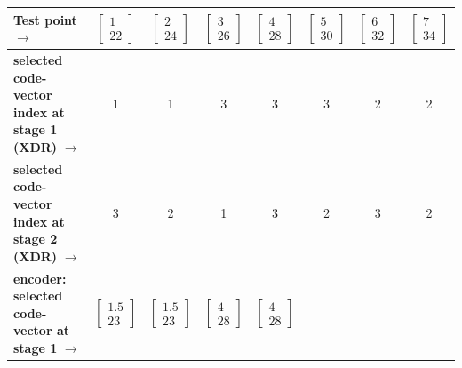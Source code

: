 \begin{table}[t]
\tiny
\centering
\begin{tabular}{|l||c|c|c|c|c|c|c|}\hline 
\textbf{Test point} $\rightarrow$                             			& 
$\left[\begin{array}{c}1 \\22\end{array}\right]$  				&
$\left[\begin{array}{c}2 \\24\end{array}\right]$ 					&
$\left[\begin{array}{c}3 \\26\end{array}\right]$   				&
$\left[\begin{array}{c}4 \\28\end{array}\right]$   				&
$\left[\begin{array}{c}5 \\30\end{array}\right]$ 					&
$\left[\begin{array}{c}6 \\32\end{array}\right]$ 					&
$\left[\begin{array}{c}7 \\34\end{array}\right]$ \\\hline\hline
\textbf{selected code-vector index at stage 1 (XDR)} $\rightarrow$ & 1     &  1   &  3   &  3   &  3   &  2     & 2 \\
\textbf{selected code-vector index at stage 2 (XDR)} $\rightarrow$ & 3     & 2     & 1   &  3   &  2   &  3     & 2 \\
\hline
\textbf{encoder: selected code-vector at stage 1} $\rightarrow$ & 
$\left[\begin{array}{c}1.5 \\23\end{array}\right]$     			&  
$\left[\begin{array}{c}1.5 \\23\end{array}\right]$				&  
$\left[\begin{array}{c}4 \\28\end{array}\right]$   				&  
$\left[\begin{array}{c}4 \\28\end{array}\right]$   				&  

\end{tabular}
\end{table}
